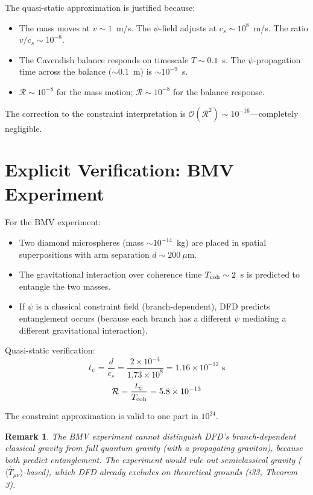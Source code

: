 \documentclass[12pt,a4paper]{article}
\newtheorem{remark}{Remark}[section]
\newcommand{\order}[1]{\mathcal{O}(#1)}
\begin{document}
The quasi-static approximation is justified because:
\begin{itemize}
\item The mass moves at $v \sim 1$~m/s. The $\psi$-field adjusts at
$c_s \sim 10^8$~m/s. The ratio $v/c_s \sim 10^{-8}$.
\item The Cavendish balance responds on timescale $T \sim 0.1$~s.
The $\psi$-propagation time across the balance ($\sim 0.1$~m) is
$\sim 10^{-9}$~s.
\item $\mathcal{R} \sim 10^{-8}$ for the mass motion;
$\mathcal{R} \sim 10^{-8}$ for the balance response.
\end{itemize}

The correction to the constraint interpretation is
$\order{\mathcal{R}^2} \sim 10^{-16}$---completely negligible.


\section{Explicit Verification: BMV Experiment}
\label{sec:bmv}

For the BMV experiment:
\begin{itemize}
\item Two diamond microspheres (mass $\sim 10^{-14}$~kg) are placed in
spatial superpositions with arm separation $d \sim 200~\mu$m.
\item The gravitational interaction over coherence time $T_{\rm coh} \sim 2$~s
is predicted to entangle the two masses.
\item If $\psi$ is a classical constraint field (branch-dependent), DFD
predicts entanglement occurs (because each branch has a different
$\psi$ mediating a different gravitational interaction).
\end{itemize}

Quasi-static verification:
\begin{equation}
t_\psi = \frac{d}{c_s} = \frac{2\times 10^{-4}}{1.73\times 10^8}
= 1.16 \times 10^{-12}\text{ s}
\end{equation}
\begin{equation}
\mathcal{R} = \frac{t_\psi}{T_{\rm coh}} = 5.8 \times 10^{-13}
\end{equation}

The constraint approximation is valid to one part in $10^{24}$.

\begin{remark}
The BMV experiment cannot distinguish DFD's branch-dependent classical
gravity from full quantum gravity (with a propagating graviton), because
both predict entanglement. The experiment would rule out semiclassical
gravity ($\langle\hat{T}_{\mu\nu}\rangle$-based), which DFD already
excludes on theoretical grounds (i33, Theorem 3).
\end{remark}
\end{document}
